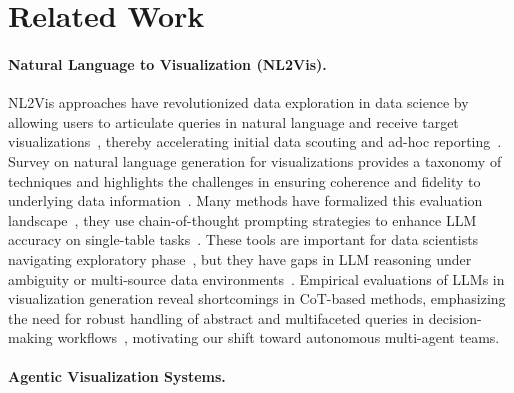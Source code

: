 \section{Related Work}
\paragraph{Natural Language to Visualization (NL2Vis).}

NL2Vis approaches have revolutionized data exploration in data science by allowing users to articulate queries in natural language and receive target visualizations~\citep{wang2023natural,shen2022towards,wu2024automated}, thereby accelerating initial data scouting and ad-hoc reporting~\citep{voigt-etal-2022-survey}. 
Survey on natural language generation for visualizations provides a taxonomy of techniques and highlights the challenges in ensuring coherence and fidelity to underlying data information~\citep{hoque2025natural}. Many methods have formalized this evaluation landscape~\citep{chen2024viseval,ouyang2025nvagent,bai2025text,shin2025visualizationary}, they use chain-of-thought prompting strategies to enhance LLM accuracy on single-table tasks~\citep{liu2025make}. These tools are important for data scientists navigating exploratory phase~\citep{zhang2025exploring,chen2025ai4research}, but they have gaps in LLM reasoning under ambiguity or multi-source data environments~\citep{zhu2025open,davila2025beyond}. Empirical evaluations of LLMs in visualization generation reveal shortcomings in CoT-based methods, emphasizing the need for robust handling of abstract and multifaceted queries in decision-making workflows~\citep{khan2025evaluating}, motivating our shift toward autonomous multi-agent teams.
\vspace{-5pt}
\paragraph{Agentic Visualization Systems.}

